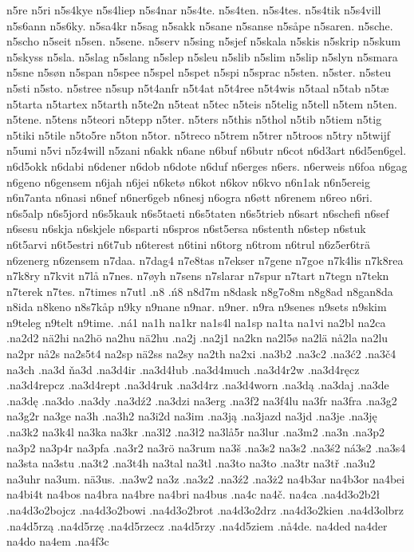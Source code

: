 {{n5re
n5ri
n5s4kye
n5s4liep
n5s4nar
n5s4te.
n5s4ten.
n5s4tes.
n5s4tik
n5s4vill
n5s6ann
n5s6ky.
n5sa4kr
n5sag
n5sakk
n5sane
n5sanse
n5såpe
n5saren.
n5sche.
n5scho
n5seit
n5sen.
n5sene.
n5serv
n5sing
n5sjef
n5skala
n5skis
n5skrip
n5skum
n5skyss
n5sla.
n5slag
n5slang
n5slep
n5sleu
n5slib
n5slim
n5slip
n5slyn
n5smara
n5sne
n5søn
n5span
n5spee
n5spel
n5spet
n5spi
n5sprac
n5sten.
n5ster.
n5steu
n5sti
n5sto.
n5stree
n5sup
n5t4anfr
n5t4at
n5t4ree
n5t4wis
n5taal
n5tab
n5tæ
n5tarta
n5tartex
n5tarth
n5te2n
n5teat
n5tec
n5teis
n5telig
n5tell
n5tem
n5ten.
n5tene.
n5tens
n5teori
n5tepp
n5ter.
n5ters
n5this
n5thol
n5tib
n5tiem
n5tig
n5tiki
n5tile
n5to5re
n5ton
n5tor.
n5treco
n5trem
n5trer
n5troos
n5try
n5twijf
n5umi
n5vi
n5z4will
n5zani
n6akk
n6ane
n6buf
n6butr
n6cot
n6d3art
n6d5en6gel.
n6d5okk
n6dabi
n6dener
n6dob
n6dote
n6duf
n6erges
n6ers.
n6erweis
n6foa
n6gag
n6geno
n6gensem
n6jah
n6jei
n6ketø
n6kot
n6kov
n6kvo
n6n1ak
n6n5ereig
n6n7anta
n6nasi
n6nef
n6ner6geb
n6nesj
n6ogra
n6øtt
n6renem
n6reo
n6ri.
n6s5alp
n6s5jord
n6s5kauk
n6s5taeti
n6s5taten
n6s5trieb
n6sart
n6schefi
n6sef
n6sesu
n6skja
n6skjele
n6sparti
n6spros
n6st5ersa
n6stenth
n6step
n6stuk
n6t5arvi
n6t5estri
n6t7ub
n6terest
n6tini
n6torg
n6trom
n6trul
n6z5er6trä
n6zenerg
n6zensem
n7daa.
n7dag4
n7e8tas
n7ekser
n7gene
n7goe
n7k4lis
n7k8rea
n7k8ry
n7kvit
n7lå
n7nes.
n7øyh
n7sens
n7slarar
n7spur
n7tart
n7tegn
n7tekn
n7terek
n7tes.
n7times
n7utl
.n8
.ń8
n8d7m
n8dask
n8g7o8m
n8g8ad
n8gan8da
n8ida
n8keno
n8s7kåp
n9ky
n9nane
n9nar.
n9ner.
n9ra
n9senes
n9sets
n9skim
n9teleg
n9telt
n9time.
.ná1
na1h
na1kr
na1s4l
na1sp
na1ta
na1vi
na2bl
na2ca
.na2d2
nä2hi
na2hö
na2hu
nä2hu
.na2j
.na2j1
na2kn
na2l5ø
na2lä
nå2la
na2lu
na2pr
nå2s
na2s5t4
na2sp
nä2ss
na2sy
na2th
na2xi
.na3b2
.na3c2
.na3ć2
.na3č4
na3ch
.na3d
ňa3d
.na3d4ir
.na3d4łub
.na3d4much
.na3d4r2w
.na3d4ręcz
.na3d4repcz
.na3d4rept
.na3d4ruk
.na3d4rz
.na3d4worn
.na3dą
.na3daj
.na3de
.na3dę
.na3do
.na3dy
.na3dź2
.na3dzi
na3erg
.na3f2
na3f4lu
na3fr
na3fra
.na3g2
na3g2r
na3ge
na3h
.na3h2
na3i2d
na3im
.na3ją
.na3jazd
na3jd
.na3je
.na3ję
.na3k2
na3k4l
na3ka
na3kr
.na3l2
.na3ł2
na3lå5r
na3lur
.na3m2
.na3n
.na3p2
na3p2
na3p4r
na3pfa
.na3r2
na3rö
na3rum
na3š
.na3s2
na3s2
.na3ś2
ná3s2
.na3s4
na3sta
na3stu
.na3t2
.na3t4h
na3tal
na3tl
.na3to
na3to
.na3tr
na3tř
.na3u2
na3uhr
na3um.
nä3us.
.na3w2
na3z
.na3z2
.na3ź2
.na3ż2
na4b3ar
na4b3or
na4bei
na4bi4t
na4bos
na4bra
na4bre
na4bri
na4bus
.na4c
na4č.
na4ca
.na4d3o2b2ł
.na4d3o2bojcz
.na4d3o2bowi
.na4d3o2brot
.na4d3o2drz
.na4d3o2kien
.na4d3olbrz
.na4d5rzą
.na4d5rzę
.na4d5rzecz
.na4d5rzy
.na4d5ziem
.nå4de.
na4ded
na4der
na4do
na4em
.na4f3c
}}
